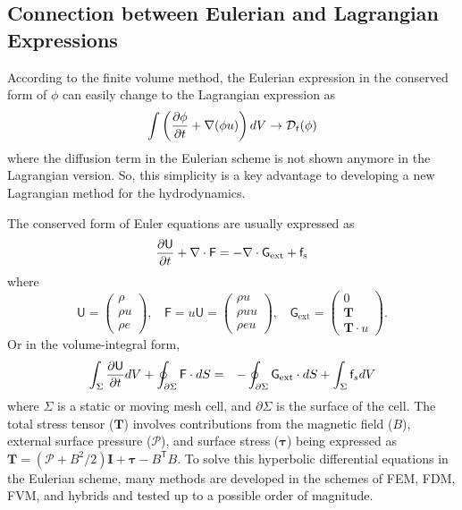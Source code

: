 \documentclass[twocolumn]{aastex63}
\newcommand{\vel}{{u}}
\newcommand{\pressure}[0]{\mathcal{P}}
\begin{document}
\subsection{Connection between Eulerian and Lagrangian Expressions}
According to the finite volume method, the Eulerian expression in the conserved form of $\phi$ can easily change to the Lagrangian expression as
\begin{equation}
	\int  \left({\partial \phi\over \partial t} + \nabla(\phi\vel)\right)dV \rightarrow \mathcal{D}_t (\phi)
\end{equation}
where the diffusion term in the Eulerian scheme is not shown anymore in the Lagrangian version.  So, this simplicity is a key advantage to developing a new Lagrangian method for the hydrodynamics.

The conserved form of Euler equations are usually expressed as
\begin{equation} \label{basic1}
	{\partial \mathsf{U}\over \partial t} + \nabla\cdot \mathsf{F} = -\nabla\cdot\mathsf{G}_\textrm{ext} +\mathsf{f}_\textrm{s}
\end{equation}
where 
\begin{equation}
\mathsf{U}=
\begin{pmatrix}
\rho \\
\rho u    \\
\rho e
\end{pmatrix}
,~~~~ \mathsf{F}= u \mathsf{U}=
\begin{pmatrix}
\rho u \\
\rho u u \\
\rho e u
\end{pmatrix}
, ~~~~ \mathsf{G}_\textrm{ext}=
\begin{pmatrix}
	0 \\
	\boldsymbol{T} \\
	\boldsymbol{T}\cdot u
\end{pmatrix}.
\end{equation}
Or in the volume-integral form, 
\begin{eqnarray}
	\label{basic}
\int_\Sigma {\partial\mathsf{U}\over \partial t}dV + \oint_{\partial \Sigma} \mathsf{F}\cdot dS 
&=& -\oint_{\partial\Sigma} \mathsf{G}_\textrm{ext}\cdot dS + \int_\Sigma \mathsf{f}_s dV
\end{eqnarray}
where $\Sigma$ is a static or moving mesh cell, and $\partial\Sigma$ is the surface of the cell.
The total stress tensor ($\boldsymbol{T}$) involves contributions from  the magnetic field ($B$), external surface pressure ($\pressure$), and surface stress ($\boldsymbol{\tau}$) being expressed as  $\boldsymbol{T} =(\mathcal{P}+B^2/2)\boldsymbol{I} +\boldsymbol{\tau} -B^\mathsf{T}B $. To solve this hyperbolic differential equations in the Eulerian scheme, many methods  are developed in the schemes of FEM, FDM, FVM, and hybrids and tested up to a possible order of magnitude.
\end{document}
